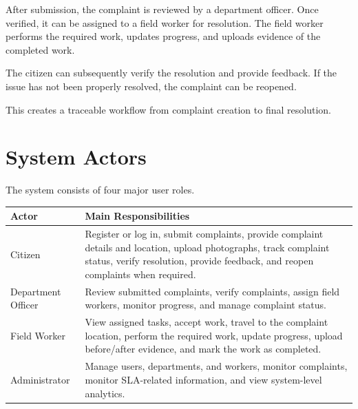\documentclass[12pt,a4paper]{article}
\begin{document}
After submission, the complaint is reviewed by a department officer. Once verified, it can be assigned to a field worker for resolution. The field worker performs the required work, updates progress, and uploads evidence of the completed work.

The citizen can subsequently verify the resolution and provide feedback. If the issue has not been properly resolved, the complaint can be reopened.

This creates a traceable workflow from complaint creation to final resolution.


\section{System Actors}

The system consists of four major user roles.

\begin{longtable}{p{} p{}}

\toprule

\textbf{Actor} & \textbf{Main Responsibilities} \\

\midrule

Citizen &
Register or log in, submit complaints, provide complaint details and location, upload photographs, track complaint status, verify resolution, provide feedback, and reopen complaints when required. \\

Department Officer &
Review submitted complaints, verify complaints, assign field workers, monitor progress, and manage complaint status. \\

Field Worker &
View assigned tasks, accept work, travel to the complaint location, perform the required work, update progress, upload before/after evidence, and mark the work as completed. \\

Administrator &
Manage users, departments, and workers, monitor complaints, monitor SLA-related information, and view system-level analytics. \\

\bottomrule

\end{longtable}
\end{document}
